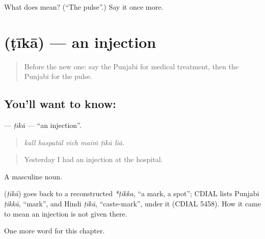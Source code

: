\begin{tcolorbox}[breakable,colback=teal!4,colframe=teal!35!black,title={Before you move on}]
What does  mean? (\textquotedblleft{}The pulse\textquotedblright{}.) Say it once more.
\end{tcolorbox}
\section[\texorpdfstring{\pa{ਟੀਕਾ} (ṭīkā)}{ਟੀਕਾ (ṭīkā)}]{ (ṭīkā) — an injection}

\label{lesson:PA-C320-tika}



\begin{quote}
Before the new one: say the Punjabi for medical treatment, then the Punjabi for the pulse.
\end{quote}

\subsection*{You'll want to know: }
\textbf{} — \emph{ṭīkā} — \textquotedblleft{}an injection\textquotedblright{}.

\begin{quote}
     
\end{quote}

\begin{quote}
\emph{kall haspatāl vich maiṁ ṭīkā liā.}
\end{quote}

\begin{quote}
Yesterday I had an injection at the hospital.
\end{quote}

A masculine noun.

\begin{cousinweb}
\textbf{} (\emph{ṭīkā}) goes back to a reconstructed \emph{*ṭikka}, \textquotedblleft{}a mark, a spot\textquotedblright{}; CDIAL lists Punjabi \emph{ṭikkā}, \textquotedblleft{}mark\textquotedblright{}, and Hindi \emph{ṭīkā}, \textquotedblleft{}caste-mark\textquotedblright{}, under it (CDIAL 5458). How it came to mean an injection is not given there.
\end{cousinweb}

\begin{grammarlens}[title={What you've built}]
One more word for this chapter.
\end{grammarlens}

